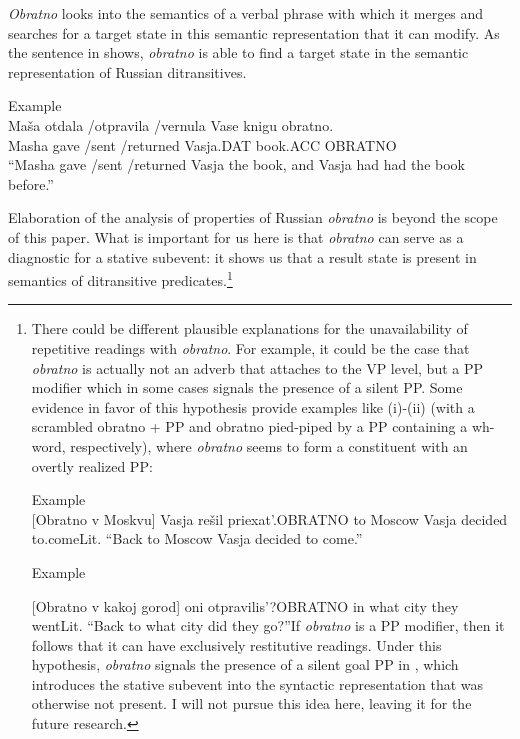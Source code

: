 \documentclass[output=paper,modfonts,nonflat,
 hidelinks
]{langsci/langscibook}
\begin{document}
\textit{Obratno} looks into the semantics of a verbal phrase with which it merges and searches for a target state in this semantic representation that it can modify. As the sentence in  shows, \textit{obratno} is able to find a target state in the semantic representation of Russian ditransitives.


 \ea\label{ex:bondarenko:}
{Example}\\

\gll Maša otdala /otpravila /vernula Vase knigu obratno.\\
     Masha gave /sent /returned Vasja.DAT book.ACC OBRATNO\\
\glt “Masha gave /sent /returned Vasja the book, and Vasja had had the book before.”
\z



Elaboration of the analysis of properties of Russian \textit{obratno} is beyond the scope of this paper. What is important for us here is that \textit{obratno} can serve as a diagnostic for a stative subevent: it shows us that a result state is present in semantics of ditransitive predicates.\footnote{There
  could be different plausible explanations for the unavailability of repetitive readings with \textit{obratno}. For example, it could be the case that \textit{obratno} is actually not an adverb that attaches to the VP level, but a PP modifier which in some cases signals the presence of a silent PP. Some evidence in favor of this hypothesis provide examples like (i)-(ii) (with a scrambled obratno + PP and obratno pied-piped by a PP containing a wh-word, respectively), where \textit{obratno} seems to form a constituent with an overtly realized PP:

  \ea\label{ex:bondarenko:}
  {Example}\\

  [Obratno v Moskvu] Vasja rešil priexat’.OBRATNO to Moscow Vasja decided to.comeLit. “Back to Moscow Vasja decided to come.”
  \z

  \ea\label{ex:bondarenko:}
  {Example}\\{}


  [Obratno v kakoj gorod] oni otpravilis’?OBRATNO in what city they wentLit. “Back to what city did they go?”If \textit{obratno} is a PP modifier, then it follows that it can have exclusively restitutive readings. Under this hypothesis, \textit{obratno} signals the presence of a silent goal PP in , which introduces the stative subevent into the syntactic representation that was otherwise not present. I will not pursue this idea here, leaving it for the future research.
  \z
}
\end{document}
